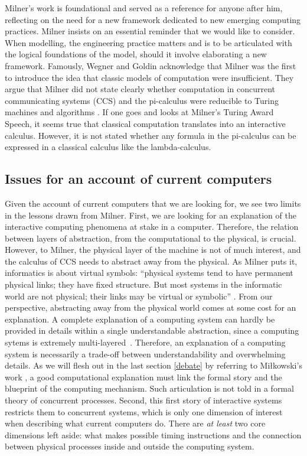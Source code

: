 \documentclass[a4paper, 11pt, twoside]{article}
\begin{document}
Milner's work is foundational and served as a reference for anyone after him, reflecting on the need for a new framework dedicated to new emerging computing practices. Milner insists on an essential reminder that we would like to consider. When modelling, the engineering practice matters and is to be articulated with the logical foundations of the model, should it involve elaborating a new framework. Famously, Wegner and Goldin acknowledge that Milner was the first to introduce the idea that classic models of computation were insufficient. They argue that Milner did not state clearly whether computation in concurrent communicating systems (CCS) and the pi-calculus were reducible to Turing machines and algorithms \parencite{Wegner2003}. If one goes and looks at Milner’s Turing Award Speech, it seems true that classical computation translates into an interactive calculus. However, it is not stated whether any formula in the pi-calculus can be expressed in a classical calculus like the lambda-calculus.

\subsection{Issues for an account of current computers}

Given the account of current computers that we are looking for, we see two limits in the lessons drawn from Milner.
First, we are looking for an explanation of the interactive computing phenomena at stake in a computer. Therefore, the relation between layers of abstraction, from the computational to the physical, is crucial. However, to Milner, the physical layer of the machine is not of much interest, and the calculus of CCS needs to abstract away from the physical. As Milner puts it, informatics is about virtual symbols: ``physical systems tend to have permanent physical links; they have fixed structure. But most systems in the informatic world are not physical; their links may be virtual or symbolic'' \parencite{Milner1999}. From our perspective, abstracting away from the physical world comes at some cost for an explanation. A complete explanation of a computing system can hardly be provided in details within a single understandable abstraction, since a computing sytems is extremely  multi-layered~\parencite{Nisan2005, Plato2018}. Therefore, an explanation of a computing system is necessarily a trade-off between understandability and overwhelming details. As we will flesh out in the last section \ref{debate} by referring to Miłkowski’s work \parencite{Mikowski2011, Mikowski2016}, a good computational explanation must link the formal story and the blueprint of the computing mechanism. Such articulation is not told in a formal theory of concurrent processes. 
Second, this first story of interactive systems restricts them to concurrent systems, which is only one dimension of interest when describing what current computers do. There are \textit{at least} two core dimensions left aside: what makes possible timing instructions and the connection between physical processes inside and outside the computing system.
\end{document}

